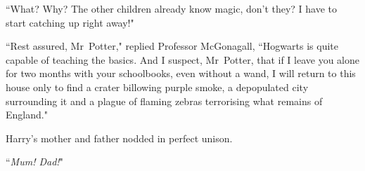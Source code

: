 ``What? Why? The other children already know magic, don't they? I have to start catching up right away!"

``Rest assured, Mr~Potter," replied Professor McGonagall, ``Hogwarts is quite capable of teaching the basics. And I suspect, Mr~Potter, that if I leave you alone for two months with your schoolbooks, even without a wand, I will return to this house only to find a crater billowing purple smoke, a depopulated city surrounding it and a plague of flaming zebras terrorising what remains of England."

Harry's mother and father nodded in perfect unison.

``\emph{Mum! Dad!}"

